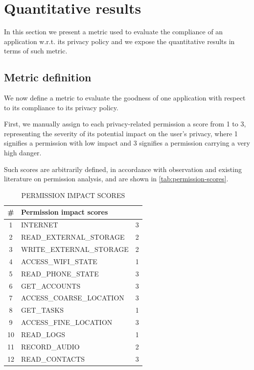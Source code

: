 \documentclass[twoside,letterpaper]{soups}
\theoremstyle{definition}
\begin{document}
\section{Quantitative results}
\label{sec:results}
In this section we present a metric used to evaluate the compliance of an application w.r.t. its privacy policy and we expose the quantitative results in terms of such metric.

\subsection{Metric definition}
\label{sec:metric}
We now define a metric to evaluate the goodness of one application with respect to its compliance to its privacy policy.

First, we manually assign to each privacy-related permission a score from 1 to 3, representing the severity of its potential impact on the user's privacy, where 1 signifies a permission with low impact and 3 signifies a permission carrying a very high danger.

Such scores are arbitrarily defined, in accordance with observation and existing literature on permission analysis,
and are shown in \autoref{tab:permission-scores}.

\begin{table}[ht]
    \caption{PERMISSION IMPACT SCORES}
    \label{tab:permission-scores}
    \centering
    \begin{tabular}{clc}
        \toprule
            \#   & Permission impact scores \\
            \midrule
                1  & INTERNET                       &   3 \\
                2  & READ\_EXTERNAL\_STORAGE        &   2 \\
                3  & WRITE\_EXTERNAL\_STORAGE       &   2 \\
                4  & ACCESS\_WIFI\_STATE            &   1 \\
                5  & READ\_PHONE\_STATE             &   3 \\
                6  & GET\_ACCOUNTS                  &   3 \\
                7  & ACCESS\_COARSE\_LOCATION       &   3 \\
                8  & GET\_TASKS                     &   1 \\
                9  & ACCESS\_FINE\_LOCATION         &   3 \\
                10 & READ\_LOGS                     &   1 \\
                11 & RECORD\_AUDIO                  &   2 \\
                12 & READ\_CONTACTS                 &   3 \\
        \bottomrule
    \end{tabular}
\end{table}
\end{document}
